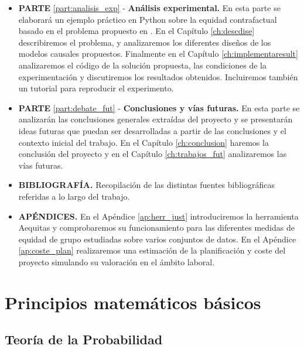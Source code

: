 \documentclass[oneside,openright,titlepage,numbers=noenddot,openany,headinclude,footinclude=true,
cleardoublepage=empty,abstractoff,BCOR=5mm,paper=a4,fontsize=12pt,main=spanish]{scrreprt}
\begin{document}
\begin{itemize}
    \item \textbf{PARTE} \ref{part:analisis_exp} - \textbf{Análisis experimental.} En esta parte se elaborará un ejemplo práctico en Python sobre la equidad contrafactual basado en el problema propuesto en \cite{counterfactual2018}. En el Capítulo \ref{ch:descdise} describiremos el problema, y analizaremos los diferentes diseños de los modelos causales propuestos. Finalmente en el Capítulo \ref{ch:implementaresult} analizaremos el código de la solución propuesta, las condiciones de la experimentación y discutiremos los resultados obtenidos. Incluiremos también un tutorial para reproducir el experimento. \vspace{3mm}
    \item \textbf{PARTE} \ref{part:debate_fut} - \textbf{Conclusiones y vías futuras.} En esta parte se analizarán las conclusiones generales extraídas del proyecto y se presentarán ideas futuras que puedan ser desarrolladas a partir de las conclusiones y el contexto inicial del trabajo. En el Capítulo \ref{ch:conclusion} haremos la conclusión del proyecto y en el Capítulo \ref{ch:trabajos_fut} analizaremos las vías futuras. \vspace{3mm}
    \item \textbf{BIBLIOGRAFÍA.} Recopilación de las distintas fuentes bibliográficas referidas a lo largo del trabajo. \vspace{3mm}
    \item \textbf{APÉNDICES.} En el Apéndice \ref{ap:herr_just} introduciremos la herramienta Aequitas y comprobaremos su funcionamiento para las diferentes medidas de equidad de grupo estudiadas sobre varios conjuntos de datos. En el Apéndice \ref{ap:coste_plan} realizaremos una estimación de la planificación y coste del proyecto simulando su valoración en el ámbito laboral.
\end{itemize}

\part{Principios matemáticos básicos} \label{part:princbasic}

\chapter{Teoría de la Probabilidad} \label{ch:teoriaprob}
\end{document}
